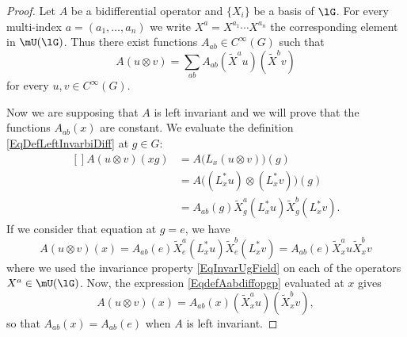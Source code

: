 \begin{proof}
	Let $A$ be a bidifferential operator and $\{ X_i \}$ be a basis of $\lG$. For every multi-index $a=(a_1,\ldots,a_n)$ we write $X^a=X^{a_1}\cdots X^{a_n}$ the corresponding element in $\mU(\lG)$. Thus there exist functions $A_{ab}\in C^{\infty}(G)$ such that
	\begin{equation}	\label{EqdefAabdiffopgp}
		A(u\otimes v)=\sum_{ab}A_{ab}(\tilde X^au)(\tilde X^bv)
	\end{equation}
	for every $u,v\in C^{\infty}(G)$.

	Now we are supposing that $A$ is left invariant and we will prove that the functions $A_{ab}(x)$ are constant. We evaluate the definition \eqref{EqDefLeftInvarbiDiff} at $g\in G$:
	\begin{equation}
		\begin{aligned}[]
			A(u\otimes v)(xg) & =A\big( L_x(u\otimes v) \big)(g)                    \\
			                  & =A\big( (L^*_xu)\otimes (L^*_xv) \big)(g)           \\
			                  & =A_{ab}(g)\tilde X^a_g(L^*_xu)\tilde X^b_g(L^*_xv).
		\end{aligned}
	\end{equation}
	If we consider that equation at $g=e$, we have
	\begin{equation}
		A(u\otimes v)(x)=A_{ab}(e)\tilde X^a_e(L^*_xu)\tilde X^b_e(L^*_xv)=A_{ab}(e)\tilde X^a_xu\tilde X^b_xv
	\end{equation}
	where we used the invariance property \eqref{EqInvarUgField} on each of the operators $X^a\in\mU(\lG)$. Now, the expression \eqref{EqdefAabdiffopgp} evaluated at $x$ gives
	\begin{equation}
		A(u\otimes v)(x)=A_{ab}(x)(\tilde X_x^au)(\tilde X_x^bv),
	\end{equation}
	so that $A_{ab}(x)=A_{ab}(e)$ when $A$ is left invariant.
\end{proof}

